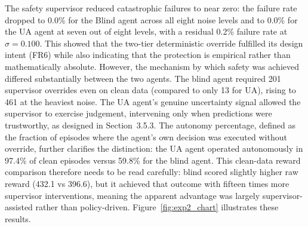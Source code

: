\documentclass[12pt,a4paper]{report}
\begin{document}
\begin{table}[h]
\centering
\small
\caption{Experiment~2 results: UA vs Blind agent with safety supervisor active. Override counts indicate the number of times the supervisor intervened across 500 episodes.}
\label{tab:exp2_results}
\renewcommand{\arraystretch}{1.2}
\setlength{\tabcolsep}{4pt}
\end{table}


The safety supervisor reduced catastrophic failures to near zero: the failure rate dropped to 0.0\% for the Blind agent across all eight noise levels and to 0.0\% for the UA agent at seven out of eight levels, with a residual 0.2\% failure rate at $\sigma = 0.100$. This showed that the two-tier deterministic override fulfilled its design intent (FR6) while also indicating that the protection is empirical rather than mathematically absolute. However, the mechanism by which safety was achieved differed substantially between the two agents. The blind agent required 201 supervisor overrides even on clean data (compared to only 13 for UA), rising to 461 at the heaviest noise. The UA agent's genuine uncertainty signal allowed the supervisor to exercise judgement, intervening only when predictions were trustworthy, as designed in Section~3.5.3. The autonomy percentage, defined as the fraction of episodes where the agent's own decision was executed without override, further clarifies the distinction: the UA agent operated autonomously in 97.4\% of clean episodes versus 59.8\% for the blind agent. This clean-data reward comparison therefore needs to be read carefully: blind scored slightly higher raw reward (432.1 vs 396.6), but it achieved that outcome with fifteen times more supervisor interventions, meaning the apparent advantage was largely supervisor-assisted rather than policy-driven. Figure~\ref{fig:exp2_chart} illustrates these results.
\end{document}
